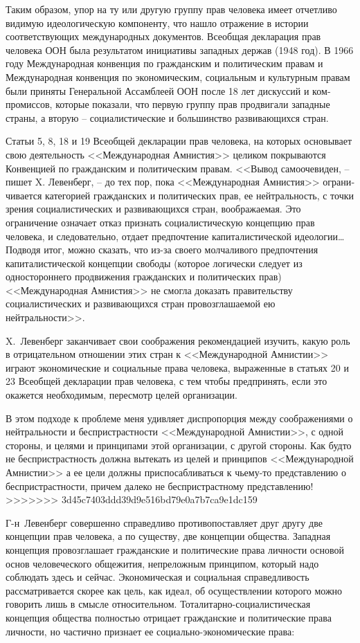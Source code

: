\documentclass{book}
\begin{document}
{Таким образом, упор на ту или другую группу прав чело­века имеет отчетливо видимую идеологическую компоненту, что нашло отражение в истории соответствующих международ­ных документов. Всеобщая декларация прав человека ООН была результатом инициативы западных держав (1948 год). В 1966 году Международная конвенция по гражданским и по­литическим правам и Международная конвенция по экономи­ческим, социальным и культурным правам были приняты Ге­неральной Ассамблеей ООН после 18 лет дискуссий и ком­промиссов, которые показали, что первую группу прав про­двигали западные страны, а вторую -- социалистические и боль­шинство развивающихся стран.

Статьи 5, 8, 18 и 19 Всеобщей декларации прав человека, на которых основывает свою деятельность <<Международная Ам­нистия>> целиком покрываются Конвенцией по гражданским и политическим правам. <<Вывод самоочевиден, -- пишет X. Левенберг, -- до тех пор, пока <<Международная Амнистия>> ограни­чивается категорией гражданских и политических прав, ее нейтральность, с точки зрения социалистических и развива­ющихся стран, воображаемая. Это ограничение означает от­каз признать социалистическую концепцию прав человека, и следовательно, отдает предпочтение капиталистической идео­логии\ldots Подводя итог, можно сказать, что из-за своего молча­ливого предпочтения капиталистической концепции свободы (которое логически следует из одностороннего продвижения гражданских и политических прав) <<Международная Амнистия>> не смогла доказать правительству социалистических и развива­ющихся стран провозглашаемой ею нейтральности>>.

X.~Левенберг заканчивает свои соображения рекоменда­цией изучить, какую роль в отрицательном отношении этих стран к <<Международной Амнистии>> играют экономические и со­циальные права человека, выраженные в статьях 20 и 23 Всеоб­щей декларации прав человека, с тем чтобы предпринять, ес­ли это окажется необходимым, пересмотр целей организации.

В этом подходе к проблеме меня удивляет диспропорция между соображениями о нейтральности и беспристрастности <<Международной Амнистии>>, с одной стороны, и целями и прин­ципами этой организации, с другой стороны. Как будто не беспристрастность должна вытекать из целей и принципов <<Международной Амнистии>> а ее цели должны приспосабливаться к чьему-то представлению о беспристрастности, причем далеко не беспристрастному представлению!
>>>>>>> 3d45c7403ddd39d9e516bd79e0a7b7ca9e1dc159

Г-н~Левенберг совершенно справедливо противопоставляет друг другу две концепции прав человека, а по существу, две концепции общества. Западная концепция провозглашает граж­данские и политические права личности основой основ чело­веческого общежития, непреложным принципом, который на­до соблюдать здесь и сейчас. Экономическая и социальная спра­ведливость рассматривается скорее как цель, как идеал, об осуществлении которого можно говорить лишь в смысле отно­сительном. Тоталитарно-социалистическая концепция общества полностью отрицает гражданские и политические права лично­сти, но частично признает ее социально-экономические права:

}
\end{document}
